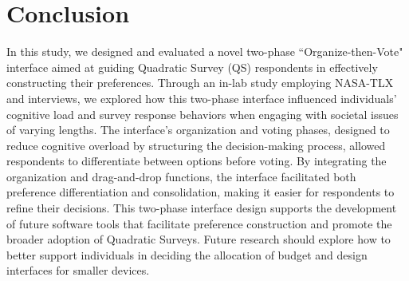 \section{Conclusion}
In this study, we designed and evaluated a novel two-phase ``Organize-then-Vote" interface aimed at guiding Quadratic Survey (QS) respondents in effectively constructing their preferences. Through an in-lab study employing NASA-TLX and interviews, we explored how this two-phase interface influenced individuals' cognitive load and survey response behaviors when engaging with societal issues of varying lengths. The interface’s organization and voting phases, designed to reduce cognitive overload by structuring the decision-making process, allowed respondents to differentiate between options before voting.  By integrating the organization and drag-and-drop functions, the interface facilitated both preference differentiation and consolidation, making it easier for respondents to refine their decisions. This two-phase interface design supports the development of future software tools that facilitate preference construction and promote the broader adoption of Quadratic Surveys. Future research should explore how to better support individuals in deciding the allocation of budget and design interfaces for smaller devices.
